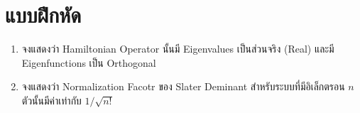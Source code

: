 \section{แบบฝึกหัด}

\begin{enumerate}[topsep=0pt,noitemsep]
    \setlength\itemsep{1em}
    \item จงแสดงว่า Hamiltonian Operator นั้นมี Eigenvalues เป็นส่วนจริง (Real) และมี Eigenfunctions เป็น Orthogonal

    \item จงแสดงว่า Normalization Facotr ของ Slater Deminant สำหรับระบบที่มีอิเล็กตรอน $n$ ตัวนั้นมีค่าเท่ากับ $1 / \sqrt{n!}$
\end{enumerate}
